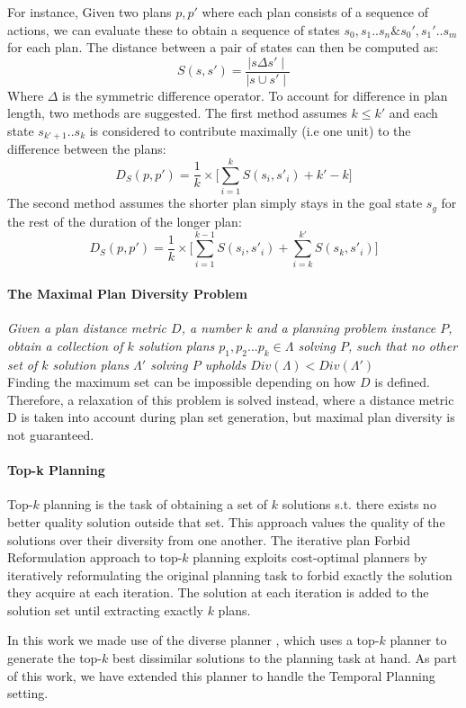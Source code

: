 \begin{tcolorbox}[colback=blue!5!white,colframe=blue!75!black]
For instance, Given two plans $p,p'$ where each plan consists of a sequence of actions,
we can evaluate these to obtain a sequence of states $s_0,s_1..s_n \& s_0',s_1'..s_m$ for each plan. 
The distance between a pair of states can then be computed as: 
\[S(s,s') = \frac{\mid s \Delta s' \mid}{\mid s \cup s' \mid}\]
Where $\Delta$ is the symmetric difference operator.
To account for difference in plan length, two methods are suggested.
The first method assumes $k \leq k'$ and each state $s_{k'+1}..s_k$ is considered to contribute maximally (i.e one unit) 
to the difference between the plans:
\[D_{S}(p,p') = \frac{1}{k} \times \bigg[\sum^k_{i=1} S(s_i,s'_i) + k'-k\bigg]\]
The second method assumes the shorter plan simply stays in the goal state $s_g$ for the rest of the duration of the longer plan:
\[D_{S}(p,p') = \frac{1}{k} \times \bigg[\sum^{k-1}_{i=1} S(s_i,s'_i) + \sum^{k'}_{i=k} S(s_k,s'_i)\bigg] \]

\end{tcolorbox}


\paragraph{The Maximal Plan Diversity Problem}
\textit{Given a plan distance metric $D$, a number $k$ and a planning problem instance $P$, obtain a collection of $k$ solution plans $p_1, p_2...p_k \in \Lambda$ solving $P$, such that no other set of $k$ solution plans $\Lambda'$ solving $P$ upholds $Div(\Lambda) < Div(\Lambda')$ } 
\\
Finding the maximum set can be impossible depending on how $D$ is defined\cite{Coman2011GeneratingMetrics}. Therefore, a relaxation of this problem is solved instead, where a distance metric D is taken into account during plan set generation, but maximal plan diversity is not guaranteed.

    
\paragraph{Top-k Planning}
Top-$k$ planning is the task of obtaining a set of $k$ solutions s.t. there exists no better quality solution outside that set. This approach values the quality of the solutions over their diversity from one another.
The iterative plan Forbid Reformulation \cite{katz2018novel} approach to top-$k$ planning
exploits cost-optimal planners by iteratively reformulating the original planning task to forbid exactly the solution they acquire at each iteration. The solution at each iteration is added to the solution set until extracting exactly $k$ plans.

In this work we made use of the diverse planner \cite{katz2019reshaping}, which uses a top-$k$ planner to generate the top-$k$ best dissimilar solutions to the planning task at hand. As part of this work, we have extended this planner to handle the Temporal Planning setting.
 